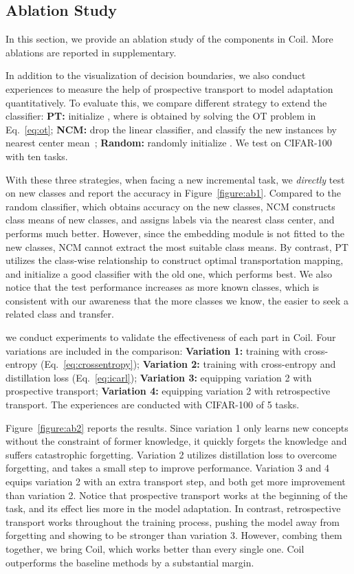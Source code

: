 \documentclass[sigconf]{acmart}
\newcommand{\name}{{\sc Coil }}
\newcommand{\mame}{{\sc Coil}}
\begin{document}
\subsection{Ablation Study}


In this section, we provide an ablation study of the components in \mame. More ablations are reported in supplementary. 

 In addition to the visualization of  decision boundaries,
we also conduct experiences to measure the help of prospective transport to model adaptation quantitatively. 
To evaluate this, we compare different strategy to extend the classifier: {\bf PT:} initialize , where  is obtained by solving the OT problem in Eq.~\ref{eq:ot}; {\bf NCM:} drop the linear classifier, and classify the new instances by nearest center mean~\cite{rebuffi2017icarl}; {\bf Random:} randomly initialize . We test on CIFAR-100 with ten tasks.

With these three strategies, when facing a new incremental task, we \emph{directly} test on new classes and report the accuracy in Figure~\ref{figure:ab1}. Compared to the random classifier, which obtains  accuracy on the new classes, NCM constructs class means of new classes, and assigns labels via the nearest class center, and performs much better. However, since the embedding module is not fitted to the new classes, NCM cannot extract the most suitable class means. By contrast, PT utilizes the class-wise relationship to construct optimal transportation  mapping, and initialize a good classifier with the old one, which performs best. We also notice that the test performance increases as more known classes, which is consistent with our awareness that the more classes we know, the easier to seek a related class and transfer.

  we conduct experiments to validate the effectiveness of each part in \mame. Four variations are included in the comparison: {\bf Variation 1:} training with cross-entropy (Eq.~\ref{eq:crossentropy}); {\bf Variation 2:} training with cross-entropy and distillation loss (Eq.~\ref{eq:icarl}); {\bf Variation 3:} equipping variation 2 with prospective transport; {\bf Variation 4:} equipping variation 2 with retrospective transport. The experiences are conducted with CIFAR-100 of 5 tasks.

Figure~\ref{figure:ab2} reports the results. Since variation 1 only learns new concepts without the constraint of former knowledge, it quickly forgets the knowledge and suffers catastrophic forgetting. Variation 2 utilizes distillation loss to overcome forgetting, and takes a small step to improve performance. Variation 3 and 4 equips variation 2 with an extra transport step, and both get more improvement than variation 2. Notice that prospective transport works at the beginning of the task, and its effect lies more in the model adaptation. In contrast, retrospective transport works throughout the training process, pushing the model away from forgetting and showing to be stronger than variation 3. However, combing them together, we bring \mame, which works better than every single one. \name outperforms the baseline methods by a substantial margin.
\end{document}
